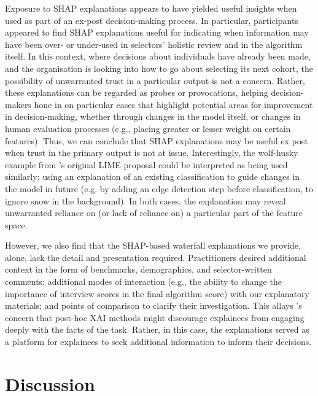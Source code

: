 Exposure to SHAP explanations appears to have yielded useful insights when used as part of an ex-post decision-making process. In particular, participants appeared to find SHAP explanations useful for indicating when information may have been over- or under-used in selectors' holistic review and in the algorithm itself. In this context, where decisions about individuals have already been made, and the organisation is looking into how to go about selecting its next cohort, the possibility of unwarranted trust in a particular output is not a concern. Rather, these explanations can be regarded as probes or provocations, helping decision-makers hone in on particular cases that highlight potential areas for improvement in decision-making, whether through changes in the model itself, or changes in human evaluation processes (e.g., placing greater or lesser weight on certain features). Thus, we can conclude that SHAP explanations may be useful ex post when trust in the primary output is not at issue. Interestingly, the wolf-husky example from \textcite{ribeiro_why_2016}'s original LIME proposal could be interpreted as being used similarly; using an explanation of an existing classification to guide changes in the model in future (e.g. by adding an edge detection step before classification, to ignore snow in the background). In both cases, the explanation may reveal unwarranted reliance on (or lack of reliance on) a particular part of the feature space.

However, we also find that the SHAP-based waterfall explanations we provide, alone, lack the detail and presentation required. Practitioners desired additional context in the form of benchmarks, demographics, and selector-written comments; additional modes of interaction (e.g., the ability to change the importance of interview scores in the final algorithm score) with our explanatory materials; and points of comparison to clarify their investigation. This allays \textcite{miller_explainable_2023}'s concern that post-hoc XAI methods might discourage explainees from engaging deeply with the facts of the task. Rather, in this case, the explanations served as a platform for explainees to seek additional information to inform their decisions.


\section{Discussion}
